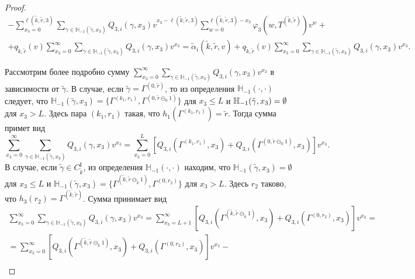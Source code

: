 \documentclass[a4paper,12pt,russian]{extarticle}
\begin{document}
\begin{proof}
\begin{multline}
-\sum_{x_3=0}^{\ell(\tilde{k},\tilde{r},3)}  \sum_{\gamma \in {\mathbb H}_{-1}(\tilde{\gamma},x_3)} Q_{3,i}(\gamma,x_3) v^{x_3-\ell(\tilde{k},\tilde{r},3)}   \sum_{w=0}^{\ell(\tilde{k},\tilde{r},3) -x_3}
\varphi_3(w,T^{(\tilde{k},\tilde{r})}) v^w   +\\
+ q_{\tilde{k},\tilde{r}}(v) \sum_{x_3=0}^{\infty} \sum_{\gamma \in {\mathbb H}_{-1}(\tilde{\gamma},x_3)} Q_{3,i}(\gamma,x_3) v^{x_3} = \tilde{\alpha}_i(\tilde{k},\tilde{r},v) + q_{\tilde{k},\tilde{r}}(v) \sum_{x_3=0}^{\infty} \sum_{\gamma \in {\mathbb H}_{-1}(\tilde{\gamma},x_3)} Q_{3,i}(\gamma,x_3) v^{x_3}.
\label{rekur:general:second}
\end{multline}

Рассмотрим более подробно сумму $\sum_{x_3=0}^{\infty} \sum_{\gamma \in {\mathbb H}_{-1}(\tilde{\gamma},x_3)} Q_{3,i}(\gamma,x_3) v^{x_3}$ в зависимости от $\tilde{\gamma}$.
В случае, если $\tilde{\gamma} = \Gamma^{(0,\tilde{r})}$, то из определения ${\mathbb H}_{-1}(\cdot,\cdot)$ следует, что ${\mathbb H}_{-1}(\tilde{\gamma},x_3) = \{\Gamma^{(k_1,r_1)}, \Gamma^{(0,\tilde{r}\ominus_0 1)}\}$ для $x_3 \leqslant L$ и
${\mathbb H}_{-1}(\tilde{\gamma},x_3) \hm=\emptyset$ для $x_3 > L$. Здесь пара $(k_1,r_1)$ такая, что $h_1(\Gamma^{(k_1,r_1)}) = \tilde{r}$. Тогда сумма примет вид
\begin{equation}
\sum_{x_3=0}^{\infty} \sum_{\gamma \in {\mathbb H}_{-1}(\tilde{\gamma},x_3)} Q_{3,i}(\gamma,x_3) v^{x_3} = \sum_{x_3=0}^{L} \left[ Q_{3,i}(\Gamma^{(k_1,r_1)},x_3) + Q_{3,i}(\Gamma^{(0,\tilde{r}\ominus_0 1)},x_3) \right] v^{x_3}.
\label{rekur:additional:first}
\end{equation}
В случае, если $\tilde{\gamma} \in C_{\tilde{k}}^{\mathrm{I}}$, из определения  ${\mathbb H}_{-1}(\cdot,\cdot)$ находим, что ${\mathbb H}_{-1}(\tilde{\gamma},x_3) = \emptyset$ для $x_3 \leqslant L$ и ${\mathbb H}_{-1}(\tilde{\gamma},x_3) = \{\Gamma^{(\tilde{k},\tilde{r}\ominus_{\tilde{k}} 1)}, \Gamma^{(0,r_2)}\}$ для $x_3 > L$. Здесь $r_2$ таково, что $h_3(r_2)=\Gamma^{(\tilde{k},\tilde{r})}$. Сумма принимает вид
\begin{multline}
\sum_{x_3=0}^{\infty} \sum_{\gamma \in {\mathbb H}_{-1}(\tilde{\gamma},x_3)} Q_{3,i}(\gamma,x_3) v^{x_3} = \sum_{x_3=L+1}^{\infty} \left[ Q_{3,i}(\Gamma^{(\tilde{k},\tilde{r}\ominus_{\tilde{k}} 1)},x_3) + Q_{3,i}(\Gamma^{(0,r_2)},x_3) \right] v^{x_3} = \\=
\sum_{x_3=0}^{\infty} \left[ Q_{3,i}(\Gamma^{(\tilde{k},\tilde{r}\ominus_{\tilde{k}} 1)},x_3) + Q_{3,i}(\Gamma^{(0,r_2)},x_3) \right] v^{x_3} -\\

\end{multline}
\end{proof}
\end{document}
